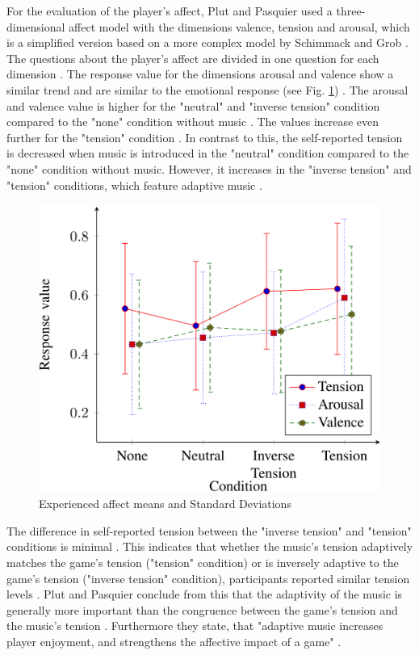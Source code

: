 For the evaluation of the player's affect, Plut and Pasquier used a three-dimensional affect model with the dimensions valence, tension and arousal, which is a simplified version based on a more complex model by Schimmack and Grob \cite{schimmack2000dimensional} \cite{plut2019music}.
The questions about the player's affect are divided in one question for each dimension \cite{plut2019music}.
The response value for the dimensions arousal and valence show a similar trend and are similar to the emotional response (see Fig. \ref{fig:music_matters_experienced_affect}) \cite{plut2019music}. The arousal and valence value is higher for the "neutral" and "inverse tension" condition compared to the "none" condition without music \cite{plut2019music}. The values increase even further for the "tension" condition \cite{plut2019music}.
In contrast to this, the self-reported tension is decreased when music is introduced in the "neutral" condition compared to the "none" condition without music. However, it increases in the "inverse tension" and "tension" conditions, which feature adaptive music \cite{plut2019music}.
\begin{figure}
    \centering
    \includegraphics[width=1\linewidth]{images/music_matters_experienced_affect.png}
    \caption{Experienced affect means and Standard Deviations \cite{plut2019music}}
    \label{fig:music_matters_experienced_affect}
\end{figure}

The difference in self-reported tension between the "inverse tension" and "tension" conditions is minimal \cite{plut2019music}. This indicates that whether the music's tension adaptively matches the game's tension ("tension" condition) or is inversely adaptive to the game's tension ("inverse tension" condition), participants reported similar tension levels \cite{plut2019music}. Plut and Pasquier conclude from this that the adaptivity of the music is generally more important than the congruence between the game's tension and the music's tension \cite{plut2019music}. 
Furthermore they state, that "adaptive music increases player enjoyment, and
strengthens the affective impact of a game" \cite{plut2019music}. 


